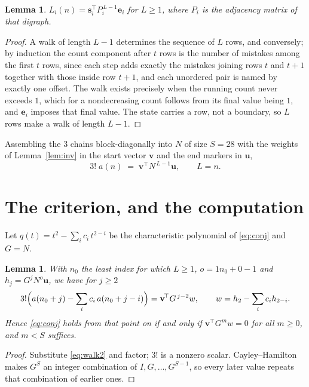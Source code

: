 \documentclass[11pt,a4paper]{article}
\theoremstyle{plain}
\newtheorem{lemma}[theorem]{Lemma}
\theoremstyle{definition}
\begin{document}
\begin{lemma}\label{lem:walk}
$L_i(n)=\mathbf{s}_i^{\!\top}P_i^{\,L-1}\mathbf{e}_i$ for $L\ge1$, where $P_i$ is the
adjacency matrix of that digraph.
\end{lemma}

\begin{proof}
A walk of length $L-1$ determines the sequence of $L$ rows, and conversely; by induction
the count component after $t$ rows is the number of mistakes among the first $t$ rows,
since each step adds exactly the mistakes joining rows $t$ and $t+1$ together with those
inside row $t+1$, and each unordered pair is named by exactly one offset. The walk exists
precisely when the running count never exceeds $1$, which for a nondecreasing count follows
from its final value being $1$, and $\mathbf{e}_i$ imposes that final value. The state
carries a row, not a boundary, so $L$ rows make a walk of length $L-1$.
\end{proof}

Assembling the $3$ chains block-diagonally into $N$ of size $S=28$ with the weights of
Lemma~\ref{lem:inv} in the start vector $\mathbf{v}$ and the end markers in
$\mathbf{u}$,
\begin{equation}\label{eq:walk2}
3!\;a(n)\;=\;\mathbf{v}^{\!\top}N^{\,L-1}\mathbf{u},\qquad L=n .
\end{equation}

\section{The criterion, and the computation}

Let $q(t)=t^{2}-\sum_i c_i\,t^{2-i}$ be the characteristic polynomial of
\eqref{eq:conj} and $G=N$.

\begin{lemma}\label{lem:crit}
With $n_0$ the least index for which $L\ge1$, $o=1n_0+0-1$ and
$h_j=G^{j}N^{o}\mathbf{u}$, we have for $j\ge2$
\[
3!\Bigl(a(n_0+j)-\sum_i c_i\,a(n_0+j-i)\Bigr)=\mathbf{v}^{\!\top}G^{\,j-2}w,
\qquad w=h_{2}-\sum_i c_ih_{2-i} .
\]
Hence \eqref{eq:conj} holds from that point on if and only if
$\mathbf{v}^{\!\top}G^{m}w=0$ for all $m\ge0$, and $m<S$ suffices.
\end{lemma}

\begin{proof}
Substitute \eqref{eq:walk2} and factor; $3!$ is a nonzero scalar. Cayley--Hamilton
makes $G^{S}$ an integer combination of $I,G,\dots,G^{S-1}$, so every later value repeats
that combination of earlier ones.
\end{proof}
\end{document}

